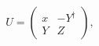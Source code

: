 \begin{equation}
U=\left(\begin{array}{cc}
x & -Y^{\dagger}\\
Y & Z
\end{array}\right),
\end{equation}

